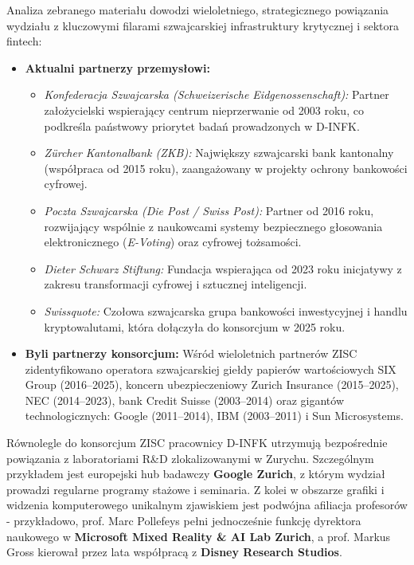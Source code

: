 Analiza zebranego materiału dowodzi wieloletniego, strategicznego powiązania wydziału z kluczowymi filarami szwajcarskiej infrastruktury krytycznej i sektora fintech:
\begin{itemize}
    \item \textbf{Aktualni partnerzy przemysłowi:}
    \begin{itemize}
        \item \textit{Konfederacja Szwajcarska (Schweizerische Eidgenossenschaft):} Partner założycielski wspierający centrum nieprzerwanie od 2003 roku, co podkreśla państwowy priorytet badań prowadzonych w D-INFK.
        \item \textit{Zürcher Kantonalbank (ZKB):} Największy szwajcarski bank kantonalny (współpraca od 2015 roku), zaangażowany w projekty ochrony bankowości cyfrowej.
        \item \textit{Poczta Szwajcarska (Die Post / Swiss Post):} Partner od 2016 roku, rozwijający wspólnie z naukowcami systemy bezpiecznego głosowania elektronicznego (\textit{E-Voting}) oraz cyfrowej tożsamości.
        \item \textit{Dieter Schwarz Stiftung:} Fundacja wspierająca od 2023 roku inicjatywy z zakresu transformacji cyfrowej i sztucznej inteligencji.
        \item \textit{Swissquote:} Czołowa szwajcarska grupa bankowości inwestycyjnej i handlu kryptowalutami, która dołączyła do konsorcjum w 2025 roku.
    \end{itemize}
    \item \textbf{Byli partnerzy konsorcjum:} Wśród wieloletnich partnerów ZISC zidentyfikowano operatora szwajcarskiej giełdy papierów wartościowych SIX Group (2016--2025), koncern ubezpieczeniowy Zurich Insurance (2015--2025), NEC (2014--2023), bank Credit Suisse (2003--2014) oraz gigantów technologicznych: Google (2011--2014), IBM (2003--2011) i Sun Microsystems.
\end{itemize}

Równolegle do konsorcjum ZISC pracownicy D-INFK utrzymują bezpośrednie powiązania z laboratoriami R\&D zlokalizowanymi w Zurychu. Szczególnym przykładem jest europejski hub badawczy \textbf{Google Zurich}, z którym wydział prowadzi regularne programy stażowe i seminaria. Z kolei w obszarze grafiki i widzenia komputerowego unikalnym zjawiskiem jest podwójna afiliacja profesorów - przykładowo, prof. Marc Pollefeys pełni jednocześnie funkcję dyrektora naukowego w \textbf{Microsoft Mixed Reality \& AI Lab Zurich}, a prof. Markus Gross kierował przez lata współpracą z \textbf{Disney Research Studios}.

